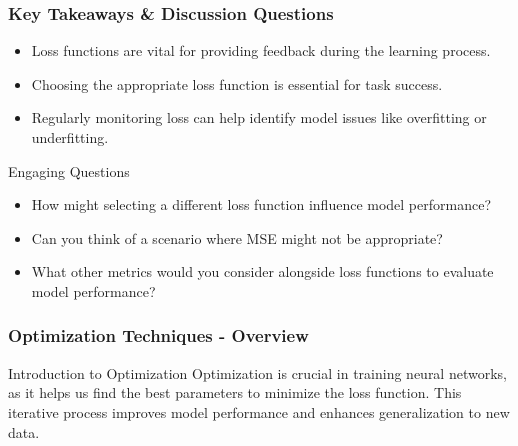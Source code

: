 \documentclass[aspectratio=169]{beamer}
\begin{document}
\begin{frame}[fragile]
    \frametitle{Key Takeaways & Discussion Questions}
    \begin{itemize}
        \item Loss functions are vital for providing feedback during the learning process.
        \item Choosing the appropriate loss function is essential for task success.
        \item Regularly monitoring loss can help identify model issues like overfitting or underfitting.
    \end{itemize}
    
    \begin{block}{Engaging Questions}
        \begin{itemize}
            \item How might selecting a different loss function influence model performance?
            \item Can you think of a scenario where MSE might not be appropriate?
            \item What other metrics would you consider alongside loss functions to evaluate model performance?
        \end{itemize}
    \end{block}
\end{frame}

\begin{frame}[fragile]
    \frametitle{Optimization Techniques - Overview}
    \begin{block}{Introduction to Optimization}
        Optimization is crucial in training neural networks, as it helps us find the best parameters to minimize the loss function. This iterative process improves model performance and enhances generalization to new data.
    \end{block}
\end{frame}
\end{document}
